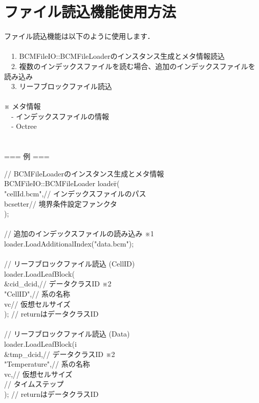 \documentclass[twoside]{jbook}
\begin{document}
\section{ファイル読込機能使用方法 \\}
ファイル読込機能は以下のように使用します． \\
 \\
　1. BCMFileIO::BCMFileLoaderのインスタンス生成とメタ情報読込 \\
　2. 複数のインデックスファイルを読む場合、追加のインデックスファイルを読み込み \\
　3. リーフブロックファイル読込 \\
 \\
※ メタ情報 \\
　- インデックスファイルの情報 \\
　- Octree \\
 \\
 \\
=== 例 === \\
\begin{tabbing}
// BCMFileLoaderのインスタンス生成とメタ情報 \\
BCMF\=ileIO::BCMFileLoader loade\=r(\\
\>"cellId.bcm",\>// インデックスファイルのパス \\
\>bcsetter\>// 境界条件設定ファンクタ \\
); \\
 \\
// 追加のインデックスファイルの読み込み ※1 \\
loader.LoadAdditionalIndex("data.bcm"); \\
 \\
// リーフブロックファイル読込 (CellID) \\
loader.LoadLeafBlock(\\
\>\&cid\_dcid,\>// データクラスID ※2 \\
\>"CellID",\>// 系の名称 \\
\>vc\>// 仮想セルサイズ \\
);         // returnはデータクラスID \\
 \\
// リーフブロックファイル読込 (Data) \\
loader.LoadLeafBlock(i\\
\>\&tmp\_dcid,\>// データクラスID ※2 \\
\>"Temperature",\>// 系の名称 \\
\>vc,\>// 仮想セルサイズ \\
\>// タイムステップ \\
);             // returnはデータクラスID \\
 \\
\end{tabbing}
\end{document}
